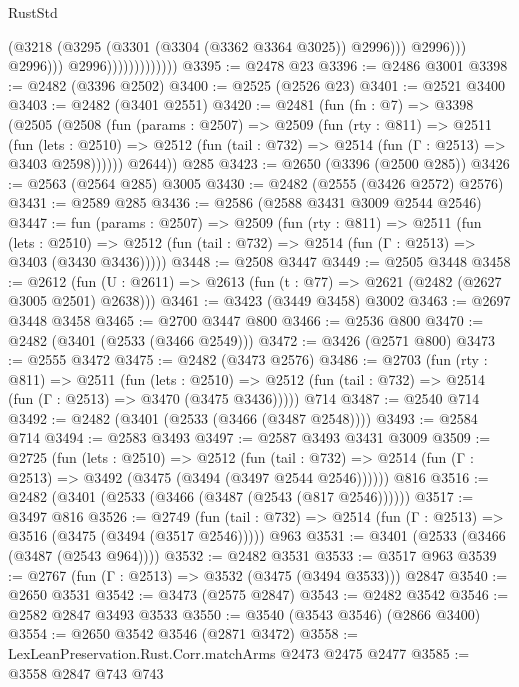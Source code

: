 \begin{lexlean}{RustStd}
\begin{coremodule}
                                          (@3218 (@3295 (@3301 (@3304 (@3362 @3364 @3025)) @2996)))
                                          @2996)))
                                    @2996)))
                              @2996)))))))))))))
@3395 := @2478 @23
@3396 := @2486 @3001
@3398 := @2482 (@3396 @2502)
@3400 := @2525 (@2526 @23)
@3401 := @2521 @3400
@3403 := @2482 (@3401 @2551)
@3420 := @2481
    (fun (fn : @7) =>
    @3398
      (@2505
        (@2508
          (fun (params : @2507) =>
          @2509
            (fun (rty : @811) =>
            @2511
              (fun (lets : @2510) =>
              @2512 (fun (tail : @732) => @2514 (fun (Γ : @2513) => @3403 @2598))))))
        @2644))
    @285
@3423 := @2650 (@3396 (@2500 @285))
@3426 := @2563 (@2564 @285) @3005
@3430 := @2482 (@2555 (@3426 @2572) @2576)
@3431 := @2589 @285
@3436 := @2586 (@2588 @3431 @3009 @2544 @2546)
@3447 := fun (params : @2507) =>
  @2509
    (fun (rty : @811) =>
    @2511
      (fun (lets : @2510) =>
      @2512 (fun (tail : @732) => @2514 (fun (Γ : @2513) => @3403 (@3430 @3436)))))
@3448 := @2508 @3447
@3449 := @2505 @3448
@3458 := @2612 (fun (U : @2611) => @2613 (fun (t : @77) => @2621 (@2482 (@2627 @3005 @2501) @2638)))
@3461 := @3423 (@3449 @3458) @3002
@3463 := @2697 @3448 @3458
@3465 := @2700 @3447 @800
@3466 := @2536 @800
@3470 := @2482 (@3401 (@2533 (@3466 @2549)))
@3472 := @3426 (@2571 @800)
@3473 := @2555 @3472
@3475 := @2482 (@3473 @2576)
@3486 := @2703
    (fun (rty : @811) =>
    @2511
      (fun (lets : @2510) =>
      @2512 (fun (tail : @732) => @2514 (fun (Γ : @2513) => @3470 (@3475 @3436)))))
    @714
@3487 := @2540 @714
@3492 := @2482 (@3401 (@2533 (@3466 (@3487 @2548))))
@3493 := @2584 @714
@3494 := @2583 @3493
@3497 := @2587 @3493 @3431 @3009
@3509 := @2725
    (fun (lets : @2510) =>
    @2512
      (fun (tail : @732) => @2514 (fun (Γ : @2513) => @3492 (@3475 (@3494 (@3497 @2544 @2546))))))
    @816
@3516 := @2482 (@3401 (@2533 (@3466 (@3487 (@2543 (@817 @2546))))))
@3517 := @3497 @816
@3526 := @2749
    (fun (tail : @732) => @2514 (fun (Γ : @2513) => @3516 (@3475 (@3494 (@3517 @2546)))))
    @963
@3531 := @3401 (@2533 (@3466 (@3487 (@2543 @964))))
@3532 := @2482 @3531
@3533 := @3517 @963
@3539 := @2767 (fun (Γ : @2513) => @3532 (@3475 (@3494 @3533))) @2847
@3540 := @2650 @3531
@3542 := @3473 (@2575 @2847)
@3543 := @2482 @3542
@3546 := @2582 @2847 @3493 @3533
@3550 := @3540 (@3543 @3546) (@2866 @3400)
@3554 := @2650 @3542 @3546 (@2871 @3472)
@3558 := LexLeanPreservation.Rust.Corr.matchArms @2473 @2475 @2477
@3585 := @3558
    @2847
    @743
    @743

\end{coremodule}
\end{lexlean}
